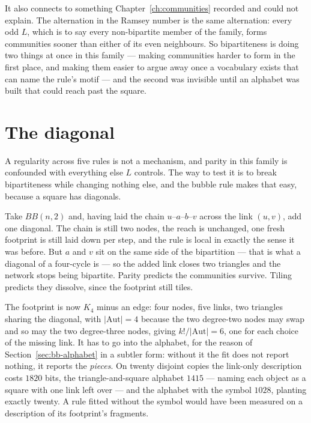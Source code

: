 It also connects to something Chapter~\ref{ch:communities} recorded and could not
explain. The alternation in the Ramsey number is the same alternation: every odd
$L$, which is to say every non-bipartite member of the family, forms communities
sooner than either of its even neighbours. So bipartiteness is doing two things
at once in this family --- making communities harder to form in the first place,
and making them easier to argue away once a vocabulary exists that can name the
rule's motif --- and the second was invisible until an alphabet was built that
could reach past the square.

\section{The diagonal}
\label{sec:bb-diagonal}

A regularity across five rules is not a mechanism, and parity in this family is
confounded with everything else $L$ controls. The way to test it is to break
bipartiteness while changing nothing else, and the bubble rule makes that easy,
because a square has diagonals.

Take $BB(n,2)$ and, having laid the chain $u$--$a$--$b$--$v$ across the link
$(u,v)$, add one diagonal. The chain is still two nodes, the reach is unchanged,
one fresh footprint is still laid down per step, and the rule is local in exactly
the sense it was before. But $a$ and $v$ sit on the same side of the bipartition
--- that is what a diagonal of a four-cycle is --- so the added link closes two
triangles and the network stops being bipartite. Parity predicts the communities
survive. Tiling predicts they dissolve, since the footprint still tiles.

The footprint is now $K_4$ minus an edge: four nodes, five links, two triangles
sharing the diagonal, with $|\mathrm{Aut}|=4$ because the two degree-two nodes may
swap and so may the two degree-three nodes, giving $k!/|\mathrm{Aut}|=6$, one for
each choice of the missing link. It has to go into the alphabet, for the reason
of Section~\ref{sec:bb-alphabet} in a subtler form: without it the fit does not
report nothing, it reports the \emph{pieces}. On twenty disjoint copies the
link-only description costs $1820$ bits, the triangle-and-square alphabet $1415$
--- naming each object as a square with one link left over --- and the alphabet
with the symbol $1028$, planting exactly twenty. A rule fitted without the symbol
would have been measured on a description of its footprint's fragments.

